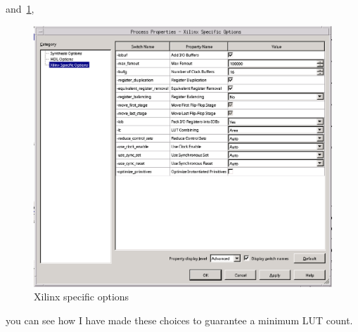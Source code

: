 \documentclass{gqtekspec}
\begin{document}
%
and~\ref{fig:xpropts},
%
\begin{figure}
\begin{center}
\includegraphics[width=6in]{../gfx/xpropts.eps}
\caption{Xilinx specific options}\label{fig:xpropts}
\end{center}\end{figure}
you can see how I have made these choices to guarantee a minimum LUT count.

%
%
%
\end{document}
